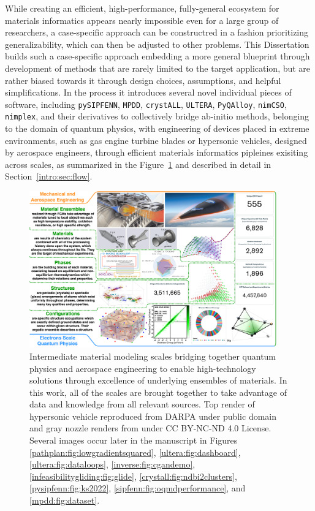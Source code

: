 While creating an efficient, high-performance, fully-general ecosystem for materials informatics appears nearly impossible even for a large group of researchers, a case-specific approach can be constructred in a fashion prioritizing generalizability, which can then be adjusted to other problems. This Dissertation builds such a case-specific approach embedding a more general blueprint through development of methods that are rarely limited to the target application, but are rather biased towards it through design choices, assumptions, and helpful simplifications. In the process it introduces several novel individual pieces of software, including \texttt{pySIPFENN}, \texttt{MPDD}, \texttt{crystALL}, \texttt{ULTERA}, \texttt{PyQAlloy}, \texttt{nimCSO}, \texttt{nimplex}, and their derivatives to collectively bridge ab-initio methods, belonging to the domain of quantum physics, with engineering of devices placed in extreme environments, such as gas engine turbine blades or hypersonic vehicles, designed by aerospace engineers, through efficient materials informatics pipleines exisiting across scales, as summarized in the Figure~\ref{intro:fig:bigpicture} and described in detail in Section~\ref{intro:sec:flow}.

\begin{figure}[H]
    \centering
    \includegraphics[width=0.95\textwidth]{intro/DissertationBigPicture.png}
    \caption{
    Intermediate material modeling scales bridging together quantum physics and aerospace engineering to enable high-technology solutions through excellence of underlying ensembles of materials. In this work, all of the scales are brought together to take advantage of data and knowledge from all relevant sources. Top render of hypersonic vehicle reproduced from DARPA under public domain and gray nozzle renders from \cite{Hofmann2014DevelopingManufacturing} under CC BY-NC-ND 4.0 License. Several images occur later in the manuscript in Figures \ref{pathplan:fig:lowgradientsquared}, \ref{ultera:fig:dashboard}, \ref{ultera:fig:dataloops}, \ref{inverse:fig:cgandemo}, \ref{infeasibilitygliding:fig:glide}, \ref{crystall:fig:ndbi2clusters}, \ref{pysipfenn:fig:ks2022}, \ref{sipfenn:fig:oqmdperformance}, and \ref{mpdd:fig:dataset}.
    }
    \label{intro:fig:bigpicture}
\end{figure}

